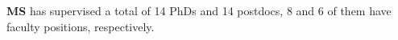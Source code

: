 \textbf{MS} has supervised a total of 14 PhDs and 14 postdocs, 8 and 6 of them have faculty positions, respectively.
